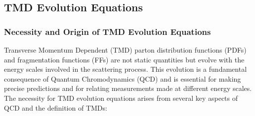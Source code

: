 \documentclass[11pt]{article}
\begin{document}
\subsection{TMD Evolution Equations}

\subsubsection{Necessity and Origin of TMD Evolution Equations}

Transverse Momentum Dependent (TMD) parton distribution functions (PDFs) and fragmentation functions (FFs) are not static quantities but evolve with
the energy scales involved in the scattering process. This evolution is a fundamental consequence of Quantum Chromodynamics (QCD) and is essential
for making precise predictions and for relating measurements made at different energy scales. The necessity for TMD evolution equations arises from
several key aspects of QCD and the definition of TMDs:
\end{document}
